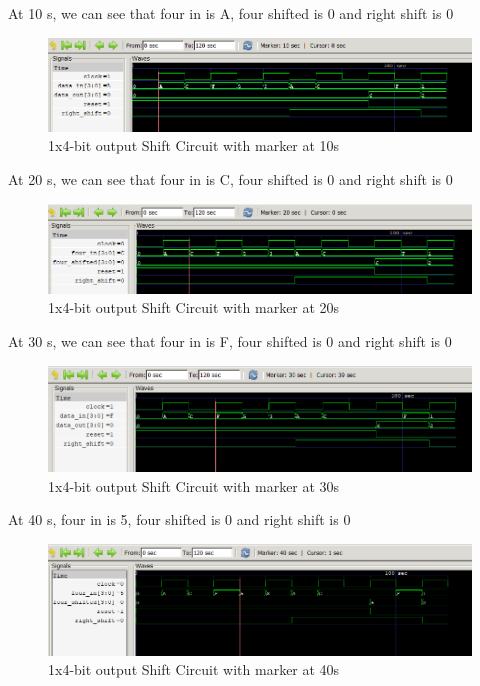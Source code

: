 \documentclass[12pt]{article}
\begin{document}
At 10 s, we can see that four in is A, four shifted is 0 and right shift is 0
\begin{figure}[h]
    \centering
    \includegraphics[width = 1.0\textwidth]{figs/Shift10.png}
    \caption{1x4-bit output Shift Circuit with marker at 10s}
    \label{fig:enter-label}
\end{figure}

\newpage

At 20 s, we can see that four in is C, four shifted is 0 and right shift is 0
\begin{figure}[h]
    \centering
    \includegraphics[width = 1.0\textwidth]{figs/Shift20.png}
    \caption{1x4-bit output Shift Circuit with marker at 20s}
    \label{fig:enter-label}
\end{figure}

At 30 s, we can see that four in is F, four shifted is 0 and right shift is 0
\begin{figure}[h]
    \centering
    \includegraphics[width = 1.0\textwidth]{figs/Shift30.png}
    \caption{1x4-bit output Shift Circuit with marker at 30s}
    \label{fig:enter-label}
\end{figure}

At 40 s, four in is 5, four shifted is 0 and right shift is 0
\begin{figure}[h]
    \centering
    \includegraphics[width = 1.0\textwidth]{figs/Shift40.png}
    \caption{1x4-bit output Shift Circuit with marker at 40s}
    \label{fig:enter-label}
\end{figure}
\end{document}
